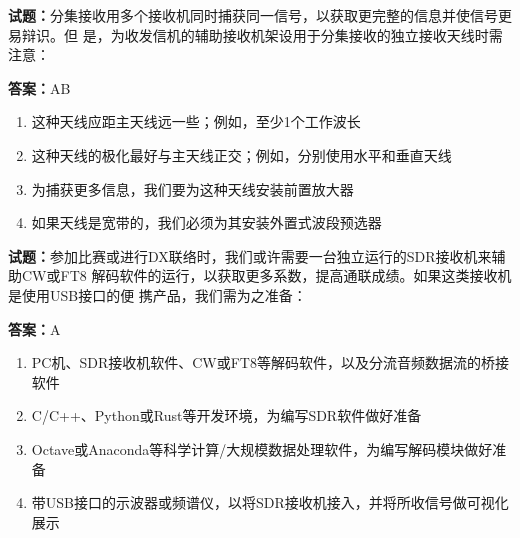 \documentclass{ctexbook}
\begin{document}




\vspace{1em}

\textbf{试题：}分集接收用多个接收机同时捕获同一信号，以获取更完整的信息并使信号更易辩识。但
是，为收发信机的辅助接收机架设用于分集接收的独立接收天线时需注意： 

\textbf{答案：}AB 

\begin{enumerate}[leftmargin=3em]
  \item 这种天线应距主天线远一些；例如，至少1个工作波长 

  \item 这种天线的极化最好与主天线正交；例如，分别使用水平和垂直天线 

  \item 为捕获更多信息，我们要为这种天线安装前置放大器 

  \item 如果天线是宽带的，我们必须为其安装外置式波段预选器 

\end{enumerate}





\vspace{1em}

\textbf{试题：}参加比赛或进行DX联络时，我们或许需要一台独立运行的SDR接收机来辅助CW或FT8
解码软件的运行，以获取更多系数，提高通联成绩。如果这类接收机是使用USB接口的便
携产品，我们需为之准备： 

\textbf{答案：}A 

\begin{enumerate}[leftmargin=3em]
  \item PC机、SDR接收机软件、CW或FT8等解码软件，以及分流音频数据流的桥接软件 

  \item C/C++、Python或Rust等开发环境，为编写SDR软件做好准备 

  \item Octave或Anaconda等科学计算/大规模数据处理软件，为编写解码模块做好准备 

  \item 带USB接口的示波器或频谱仪，以将SDR接收机接入，并将所收信号做可视化展示 

\end{enumerate}

\end{document}
